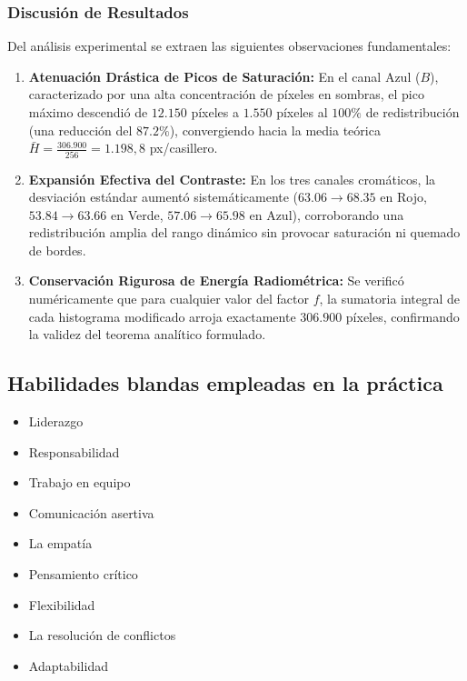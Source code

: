 \documentclass{article}
\newcommand{\checkedbox}{\stackinset{c}{0pt}{c}{0pt}{\checkmark}{$\square$}}
\begin{document}
\subsubsection{Discusión de Resultados}
Del análisis experimental se extraen las siguientes observaciones fundamentales:
\begin{enumerate}
    \item \textbf{Atenuación Drástica de Picos de Saturación:} En el canal Azul ($B$), caracterizado por una alta concentración de píxeles en sombras, el pico máximo descendió de $12.150$ píxeles a $1.550$ píxeles al $100\%$ de redistribución (una reducción del $87.2\%$), convergiendo hacia la media teórica $\bar{H} = \frac{306.900}{256} = 1.198,8$ px/casillero.
    \item \textbf{Expansión Efectiva del Contraste:} En los tres canales cromáticos, la desviación estándar aumentó sistemáticamente ($63.06 \to 68.35$ en Rojo, $53.84 \to 63.66$ en Verde, $57.06 \to 65.98$ en Azul), corroborando una redistribución amplia del rango dinámico sin provocar saturación ni quemado de bordes.
    \item \textbf{Conservación Rigurosa de Energía Radiométrica:} Se verificó numéricamente que para cualquier valor del factor $f$, la sumatoria integral de cada histograma modificado arroja exactamente $306.900$ píxeles, confirmando la validez del teorema analítico formulado.
\end{enumerate}

\subsection{Habilidades blandas empleadas en la práctica}
\begin{itemize}
    \item[$\square$] Liderazgo
    \item[$\checkedbox$] Responsabilidad
    \item[$\checkedbox$] Trabajo en equipo
    \item[$\checkedbox$] Comunicación asertiva
    \item[$\square$] La empatía
    \item[$\checkedbox$] Pensamiento crítico
    \item[$\square$] Flexibilidad
    \item[$\checkedbox$] La resolución de conflictos
    \item[$\square$] Adaptabilidad
\end{itemize}
\end{document}

